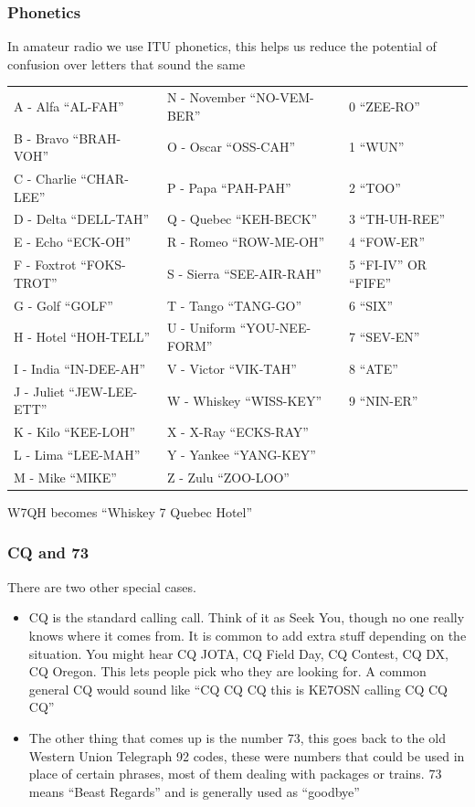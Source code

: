 \documentclass[10pt, handout]{beamer}
\begin{document}
\begin{frame}
\frametitle{Phonetics}
In amateur radio we use ITU phonetics, this helps us reduce the potential of confusion over letters that sound the same
\begin{tabular}{l l l}
\scriptsize A - Alfa ``AL-FAH''& \scriptsize  N - November ``NO-VEM-BER'' & \scriptsize  0 ``ZEE-RO''\\
\scriptsize B - Bravo ``BRAH-VOH''& \scriptsize  O - Oscar ``OSS-CAH'' & \scriptsize  1 ``WUN''\\
\scriptsize C - Charlie ``CHAR-LEE''& \scriptsize  P - Papa ``PAH-PAH'' & \scriptsize  2 ``TOO''\\
\scriptsize D - Delta ``DELL-TAH''& \scriptsize  Q - Quebec ``KEH-BECK'' & \scriptsize  3 ``TH-UH-REE''\\
\scriptsize E - Echo ``ECK-OH''& \scriptsize  R - Romeo ``ROW-ME-OH'' & \scriptsize  4 ``FOW-ER''\\
\scriptsize F - Foxtrot ``FOKS-TROT''& \scriptsize  S - Sierra ``SEE-AIR-RAH'' & \scriptsize  5 ``FI-IV'' OR ``FIFE''\\
\scriptsize G - Golf ``GOLF''& \scriptsize  T - Tango ``TANG-GO'' & \scriptsize  6 ``SIX''\\
\scriptsize H - Hotel ``HOH-TELL''& \scriptsize  U - Uniform ``YOU-NEE-FORM'' & \scriptsize  7 ``SEV-EN''\\
\scriptsize I - India ``IN-DEE-AH''& \scriptsize  V - Victor ``VIK-TAH'' & \scriptsize  8 ``ATE''\\
\scriptsize J - Juliet ``JEW-LEE-ETT''& \scriptsize  W - Whiskey ``WISS-KEY'' & \scriptsize  9 ``NIN-ER''\\
\scriptsize K - Kilo ``KEE-LOH''& \scriptsize  X - X-Ray ``ECKS-RAY''\\
\scriptsize L - Lima ``LEE-MAH''& \scriptsize  Y - Yankee ``YANG-KEY''\\
\scriptsize M - Mike ``MIKE''& \scriptsize  Z - Zulu ``ZOO-LOO''\\
\end{tabular}
W7QH becomes ``Whiskey 7 Quebec Hotel'' 
\end{frame}

\begin{frame}
\frametitle{CQ and 73}
There are two other special cases.
\begin{itemize}
\item CQ is the standard calling call. Think of it as Seek You, though no one really knows where it comes from. It is common to add extra stuff depending on the situation. You might hear CQ JOTA, CQ Field Day, CQ Contest, CQ DX, CQ Oregon. This lets people pick who they are looking for. A common general CQ would sound like ``CQ CQ CQ this is KE7OSN calling CQ CQ CQ''
\item The other thing that comes up is the number 73, this goes back to the old Western Union Telegraph 92 codes, these were numbers that could be used in place of certain phrases, most of them dealing with packages or trains. 73 means ``Beast Regards'' and is generally used as ``goodbye''
\end{itemize}
\end{frame}
\end{document}
